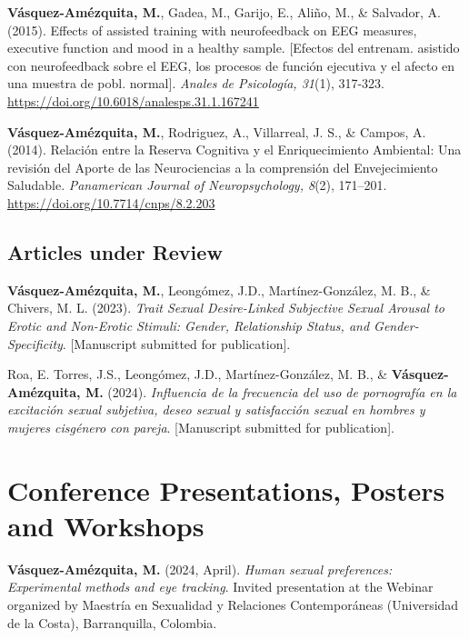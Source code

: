 \documentclass[11pt,a4paper,]{awesome-cv}
\begin{document}
\textbf{Vásquez-Amézquita, M.}, Gadea, M., Garijo, E., Aliño, M., \&
Salvador, A. (2015). Effects of assisted training with neurofeedback on
EEG measures, executive function and mood in a healthy sample.
{[}Efectos del entrenam. asistido con neurofeedback sobre el EEG, los
procesos de función ejecutiva y el afecto en una muestra de pobl.
normal{]}. \emph{Anales de Psicología, 31}(1), 317-323.
\url{https://doi.org/10.6018/analesps.31.1.167241}

\textbf{Vásquez-Amézquita, M.}, Rodriguez, A., Villarreal, J. S., \&
Campos, A. (2014). Relación entre la Reserva Cognitiva y el
Enriquecimiento Ambiental: Una revisión del Aporte de las Neurociencias
a la comprensión del Envejecimiento Saludable. \emph{Panamerican Journal
of Neuropsychology, 8}(2), 171--201.
\url{https://doi.org/10.7714/cnps/8.2.203}

\endgroup

\subsection{\texorpdfstring{\textbf{Articles under Review}}{}}\label{section-1}

\begingroup
\footnotesize
\setlength{\parindent}{-0.5in}
\setlength{\leftskip}{0.5in}

\textbf{Vásquez-Amézquita, M.}, Leongómez, J.D., Martínez-González, M.
B., \& Chivers, M. L. (2023). \emph{Trait Sexual Desire-Linked
Subjective Sexual Arousal to Erotic and Non-Erotic Stimuli: Gender,
Relationship Status, and Gender-Specificity}. {[}Manuscript submitted
for publication{]}.

Roa, E. Torres, J.S., Leongómez, J.D., Martínez-González, M. B., \&
\textbf{Vásquez-Amézquita, M.} (2024). \emph{Influencia de la frecuencia
del uso de pornografía en la excitación sexual subjetiva, deseo sexual y
satisfacción sexual en hombres y mujeres cisgénero con pareja}.
{[}Manuscript submitted for publication{]}.

\endgroup

\section{Conference Presentations, Posters and
Workshops}\label{conference-presentations-posters-and-workshops}

\begingroup
\footnotesize
\setlength{\parindent}{-0.5in}
\setlength{\leftskip}{0.5in}

\textbf{Vásquez-Amézquita, M.} (2024, April). \emph{Human sexual
preferences: Experimental methods and eye tracking}. Invited
presentation at the Webinar organized by Maestría en Sexualidad y
Relaciones Contemporáneas (Universidad de la Costa), Barranquilla,
Colombia.
\end{document}

